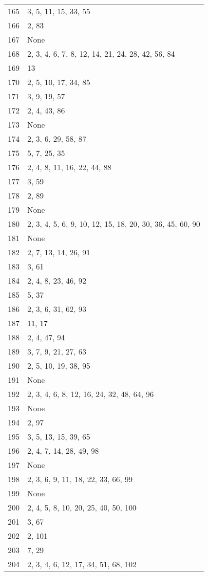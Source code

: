 \documentclass[12pt]{article}
\begin{document}
\begin{tabular}{|r|l|}
165 & 3, 5, 11, 15, 33, 55 \\ 
166 & 2, 83 \\ 
167 & None \\ 
168 & 2, 3, 4, 6, 7, 8, 12, 14, 21, 24, 28, 42, 56, 84 \\ 
169 & 13 \\ 
170 & 2, 5, 10, 17, 34, 85 \\ 
171 & 3, 9, 19, 57 \\ 
172 & 2, 4, 43, 86 \\ 
173 & None \\ 
174 & 2, 3, 6, 29, 58, 87 \\ 
175 & 5, 7, 25, 35 \\ 
176 & 2, 4, 8, 11, 16, 22, 44, 88 \\ 
177 & 3, 59 \\ 
178 & 2, 89 \\ 
179 & None \\ 
180 & 2, 3, 4, 5, 6, 9, 10, 12, 15, 18, 20, 30, 36, 45, 60, 90 \\ 
181 & None \\ 
182 & 2, 7, 13, 14, 26, 91 \\ 
183 & 3, 61 \\ 
184 & 2, 4, 8, 23, 46, 92 \\ 
185 & 5, 37 \\ 
186 & 2, 3, 6, 31, 62, 93 \\ 
187 & 11, 17 \\ 
188 & 2,  4, 47, 94 \\ 
189 & 3, 7, 9, 21, 27, 63 \\ 
190 & 2, 5, 10, 19, 38, 95 \\ 
191 & None \\ 
192 & 2, 3, 4, 6, 8, 12, 16, 24, 32, 48, 64, 96 \\ 
193 & None \\ 
194 & 2, 97 \\ 
195 & 3, 5, 13, 15, 39, 65 \\ 
196 & 2, 4, 7, 14, 28, 49, 98 \\ 
197 & None \\ 
198 & 2, 3, 6, 9, 11, 18, 22, 33, 66, 99 \\ 
199 & None \\ 
200 & 2, 4, 5, 8, 10, 20, 25, 40, 50, 100 \\ 
201 & 3,  67 \\ 
202 & 2, 101 \\ 
203 & 7, 29 \\ 
204 & 2, 3, 4, 6, 12, 17, 34, 51, 68, 102 \\ 

\end{tabular}
\end{document}
